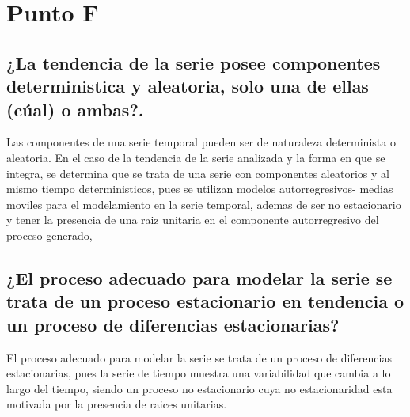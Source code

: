 \documentclass[
]{article}
\begin{document}
\hypertarget{punto-f}{%
\section{Punto F}\label{punto-f}}

\hypertarget{la-tendencia-de-la-serie-posee-componentes-deterministica-y-aleatoria-solo-una-de-ellas-cuxfaal-o-ambas.}{%
\subsection{¿La tendencia de la serie posee componentes deterministica y
aleatoria, solo una de ellas (cúal) o
ambas?.}\label{la-tendencia-de-la-serie-posee-componentes-deterministica-y-aleatoria-solo-una-de-ellas-cuxfaal-o-ambas.}}

Las componentes de una serie temporal pueden ser de naturaleza
determinista o aleatoria. En el caso de la tendencia de la serie
analizada y la forma en que se integra, se determina que se trata de una
serie con componentes aleatorios y al mismo tiempo deterministicos, pues
se utilizan modelos autorregresivos- medias moviles para el modelamiento
en la serie temporal, ademas de ser no estacionario y tener la presencia
de una raiz unitaria en el componente autorregresivo del proceso
generado,

\hypertarget{el-proceso-adecuado-para-modelar-la-serie-se-trata-de-un-proceso-estacionario-en-tendencia-o-un-proceso-de-diferencias-estacionarias}{%
\subsection{¿El proceso adecuado para modelar la serie se trata de un
proceso estacionario en tendencia o un proceso de diferencias
estacionarias?}\label{el-proceso-adecuado-para-modelar-la-serie-se-trata-de-un-proceso-estacionario-en-tendencia-o-un-proceso-de-diferencias-estacionarias}}

El proceso adecuado para modelar la serie se trata de un proceso de
diferencias estacionarias, pues la serie de tiempo muestra una
variabilidad que cambia a lo largo del tiempo, siendo un proceso no
estacionario cuya no estacionaridad esta motivada por la presencia de
raices unitarias.
\end{document}
